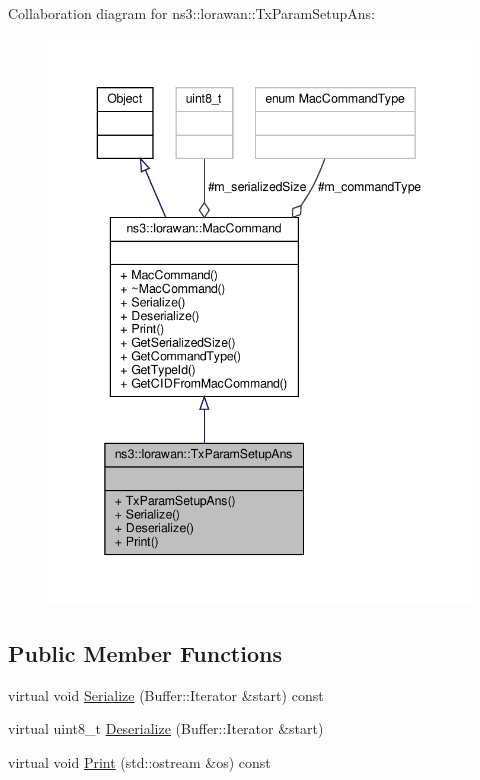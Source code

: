Collaboration diagram for ns3\+:\+:lorawan\+:\+:Tx\+Param\+Setup\+Ans\+:
\nopagebreak
\begin{figure}[H]
\begin{center}
\leavevmode
\includegraphics[width=343pt]{classns3_1_1lorawan_1_1TxParamSetupAns__coll__graph}
\end{center}
\end{figure}
\subsection*{Public Member Functions}
\begin{DoxyCompactItemize}
\item 
virtual void \hyperlink{classns3_1_1lorawan_1_1TxParamSetupAns_a274b762e74e9a5b39d0fc50819d81b3f}{Serialize} (Buffer\+::\+Iterator \&start) const
\item 
virtual uint8\+\_\+t \hyperlink{classns3_1_1lorawan_1_1TxParamSetupAns_a74b739bce4a3443d9e9cba1cf397d43f}{Deserialize} (Buffer\+::\+Iterator \&start)
\item 
virtual void \hyperlink{classns3_1_1lorawan_1_1TxParamSetupAns_ac25e03a1ce6ce0d52ba94f56bac8c208}{Print} (std\+::ostream \&os) const
\end{DoxyCompactItemize}
